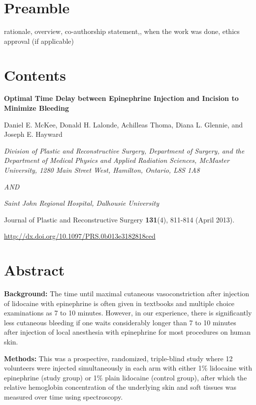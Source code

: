 \section*{Preamble}
rationale, overview, co-authorship statement,, when the work was done, ethics approval (if applicable)

\section*{Contents}

\begin{center}

\textbf{Optimal Time Delay between Epinephrine Injection and Incision to Minimize Bleeding}

Daniel E. McKee, Donald H. Lalonde, Achilleas Thoma, Diana L. Glennie, and Joseph E. Hayward

\textit{Division of Plastic and Reconstructive Surgery, Department of Surgery, and the Department of Medical Physics and Applied Radiation Sciences, McMaster University, 1280 Main Street West, Hamilton, Ontario, L8S 1A8}

\textit{AND}

\textit{Saint John Regional Hospital, Dalhousie University}

\end{center}

\noindent Journal of Plastic and Reconstructive Surgery \textbf{131}(4), 811-814 (April 2013).

\noindent \url{http://dx.doi.org/10.1097/PRS.0b013e3182818ced}

\section*{Abstract}

\textbf{Background:} The time until maximal cutaneous vasoconstriction after injection of lidocaine with epinephrine is often given in textbooks and multiple choice examinations as 7 to 10 minutes. However, in our experience, there is significantly less cutaneous bleeding if one waits considerably longer than 7 to 10 minutes after injection of local anesthesia with epinephrine for most procedures on human skin.

\textbf{Methods:} This was a prospective, randomized, triple-blind study where 12 volunteers were injected simultaneously in each arm with either 1\% lidocaine with epinephrine (study group) or 1\% plain lidocaine (control group), after which the relative hemoglobin concentration of the underlying skin and soft tissues was measured over time using spectroscopy.

